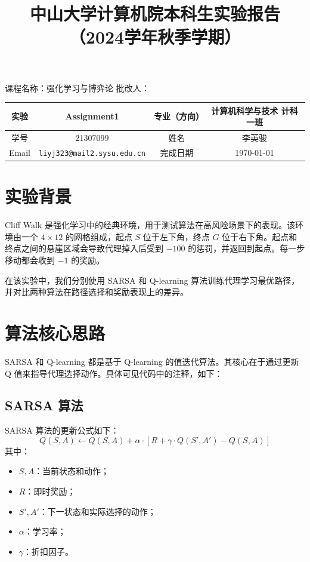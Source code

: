 \documentclass{article}
\title{中山大学计算机院本科生实验报告\\
    （2024学年秋季学期）}
\begin{document}
\maketitle
课程名称：强化学习与博弈论 \qquad\qquad\qquad\qquad\qquad\qquad
批改人：
\begin{table}[h]
    \centering
    \begin{tabular}{|c|c|c|c|} \hline
        实验    & Assignment1                 & 专业（方向） & 计算机科学与技术 计科一班 \\ \hline
        学号    & 21307099                           & 姓名     & 李英骏           \\\hline
        Email & \texttt{liyj323@mail2.sysu.edu.cn} & 完成日期   & \today        \\\hline
    \end{tabular}
\end{table}
\tableofcontents

\newpage
\section{实验背景}
Cliff Walk 是强化学习中的经典环境，用于测试算法在高风险场景下的表现。该环境由一个 $4 \times 12$ 的网格组成，起点 $S$ 位于左下角，终点 $G$ 位于右下角。起点和终点之间的悬崖区域会导致代理掉入后受到 $-100$ 的惩罚，并返回到起点。每一步移动都会收到 $-1$ 的奖励。

在该实验中，我们分别使用 SARSA 和 Q-learning 算法训练代理学习最优路径，并对比两种算法在路径选择和奖励表现上的差异。

\section{算法核心思路}
SARSA 和 Q-learning 都是基于 Q-learning 的值迭代算法。其核心在于通过更新 Q 值来指导代理选择动作。具体可见代码中的注释，如下：

\subsection{SARSA 算法}
SARSA 算法的更新公式如下：
\[
Q(S, A) \gets Q(S, A) + \alpha \cdot \left[ R + \gamma \cdot Q(S', A') - Q(S, A) \right]
\]
其中：
\begin{itemize}
    \item $S, A$：当前状态和动作；
    \item $R$：即时奖励；
    \item $S', A'$：下一状态和实际选择的动作；
    \item $\alpha$：学习率；
    \item $\gamma$：折扣因子。
\end{itemize}
\end{document}
